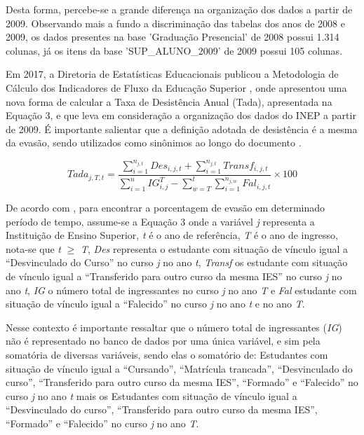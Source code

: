 Desta forma, percebe-se a grande diferença na organização dos dados a partir de 2009. Observando mais a fundo a discriminação das tabelas dos anos de 2008 e 2009, os dados presentes na base 'Graduação Presencial' de 2008 possui 1.314 colunas, já os itens da base 'SUP\_ALUNO\_2009' de 2009 possui 105 colunas.




Em 2017, a Diretoria de Estatísticas Educacionais publicou a Metodologia de Cálculo dos Indicadores de Fluxo da Educação Superior , onde apresentou uma nova forma de calcular a Taxa de Desistência Anual (Tada), apresentada na Equação 3, e que leva em consideração a organização dos dados do INEP a partir de 2009. É importante salientar que a definição adotada de desistência é a mesma da evasão, sendo utilizados como sinônimos ao longo do documento .

\begin{equation}\label{eq:evasaonova}
{Tada_{j,T,t}} = \frac{\sum_{i=1}^{n_{j,t}} Des_{i,j,t} + \sum_{i=1}^{n_{j,t}} Transf_{i,j,t}} {\sum_{i=1}^{n} IG^T_{i,j} - \sum_{w=T}^{t} \sum_{i=1}^{n_{j,w}} Fal_{i,j,t}} \times{100}
\end{equation}

De acordo com , para encontrar a porcentagem de evasão em determinado período de tempo, assume-se a Equação 3 onde a variável \textit{j} representa a Instituição de Ensino Superior, \textit{t} é o ano de referência, \textit{T} é o ano de ingresso, nota-se que \textit{t} $\geq$ \textit{T}, \textit{Des} representa o estudante com situação de vínculo igual a “Desvinculado do Curso” no curso \textit{j} no ano \textit{t}, \textit{Transf} os estudante com situação de vínculo igual a “Transferido para outro curso da mesma IES” no curso \textit{j} no ano \textit{t}, \textit{IG} o número total de ingressantes no curso \textit{j} no ano \textit{T} e \textit{Fal} estudante com situação de vínculo igual a “Falecido” no curso \textit{j} no ano \textit{t} e no ano \textit{T}. 

Nesse contexto é importante ressaltar que o número total de ingressantes (\textit{IG}) não é representado no banco de dados por uma única variável, e sim pela somatória de diversas variáveis, sendo elas o somatório de: Estudantes com situação de vínculo igual a ``Cursando'', ``Matrícula trancada'', ``Desvinculado do curso'', ``Transferido para outro curso da mesma IES'', ``Formado” e  ``Falecido'' no curso \textit{j} no ano \textit{t} mais os Estudantes com situação de vínculo igual a ``Desvinculado do curso'', ``Transferido para outro curso da mesma IES'', ``Formado'' e  ``Falecido'' no curso \textit{j} no ano \textit{T}.

